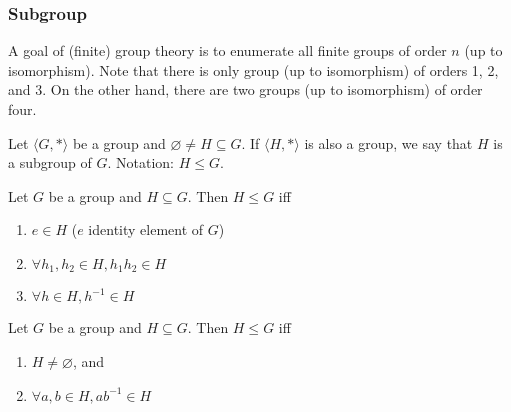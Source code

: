 \subsubsection{Subgroup}

A goal of  (finite) group theory is to enumerate all finite groups of order $n$ (up to isomorphism). Note that there is only group (up to isomorphism) of orders 1, 2, and 3. On the other hand, there are two groups (up to isomorphism) of order four.

\begin{definition}
    Let $\langle G, \ast \rangle$ be a group and $\varnothing \neq H \subseteq G$. If $\langle H, \ast \rangle$ is also a group, we say that $H$ is a subgroup of $G$. Notation: $H \leq G$. 
\end{definition}

\begin{theorem}
    Let $G$ be a group and $H \subseteq G$. Then $H \leq G$ iff
    \begin{enumerate}
        \item $e \in H$ ($e$ identity element of $G$)
        \item $\forall h_1, h_2 \in H, h_1h_2 \in H$
        \item $\forall h \in H, h^{-1} \in H$
    \end{enumerate}
\end{theorem}

\begin{theorem}
    Let $G$ be a group and $H \subseteq G$. Then $H \leq G$ iff
    \begin{enumerate}
        \item $H \neq \varnothing$, and 
        \item $\forall a, b \in H, ab^{-1} \in H$
    \end{enumerate}
\end{theorem}


